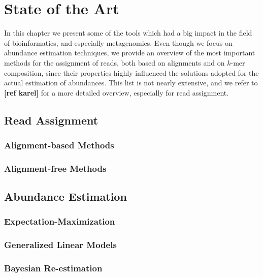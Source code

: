 
\chapter{State of the Art} %
\label{Chapter2}

In this chapter we present some of the tools which had a big impact in the field of bioinformatics, and especially metagenomics. Even though we focus on abundance estimation techniques, we provide an overview of the most important methods for the assignment of reads, both based on alignments and on $k$-mer composition, since their properties highly influenced the solutions adopted for the actual estimation of abundances. This list is not nearly extensive, and we refer to \textbf{[ref karel]} for a more detailed overview, especially for read assignment.

\section{Read Assignment}

\subsection{Alignment-based Methods}

\subsection{Alignment-free Methods}

\section{Abundance Estimation}

\subsection{Expectation-Maximization}

\subsection{Generalized Linear Models}

\subsection{Bayesian Re-estimation}
